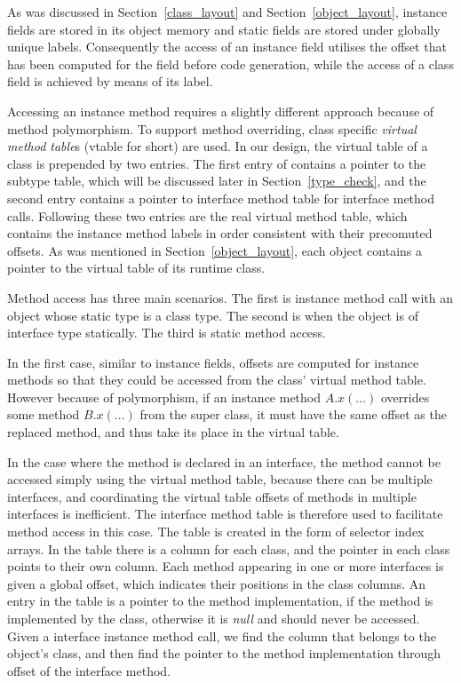 \documentclass[a4paper, notitlepage]{report}
\begin{document}
As was discussed in Section~\ref{class_layout} and Section~\ref{object_layout}, instance fields are stored in its object memory and static fields are stored under globally unique labels. Consequently the access of an instance field utilises the offset that has been computed for the field before code generation, while the access of a class field is achieved by means of its label.

Accessing an instance method requires a slightly different approach because of method polymorphism. To support method overriding, class specific \emph{virtual method table}s (vtable for short) are used. In our design, the virtual table of a class is prepended by two entries. The first entry of contains a pointer to the subtype table, which will be discussed later in Section~\ref{type_check}, and the second entry contains a pointer to interface method table for interface method calls. Following these two entries are the real virtual method table, which contains the instance method labels in order consistent with their precomuted offsets. As was mentioned in Section~\ref{object_layout}, each object contains a pointer to the virtual table of its runtime class. 

Method access has three main scenarios. The first is instance method call with an object whose static type is a class type. The second is when the object is of interface type statically. The third is static method access.

In the first case, similar to instance fields, offsets are computed for instance methods so that they could be accessed from the class' virtual method table. However because of polymorphism, if an instance method $A.x(...)$ overrides some method $B.x(...)$ from the super class, it must have the same offset as the replaced method, and thus take its place in the virtual table. 

In the case where the method is declared in an interface, the method cannot be accessed simply using the virtual method table, because there can be multiple interfaces, and coordinating the virtual table offsets of methods in multiple interfaces is inefficient. The interface method table is therefore used to facilitate method access in this case. The table is created in the form of selector index arrays. In the table there is a column for each class, and the pointer in each class points to their own column. Each method appearing in one or more interfaces is given a global offset, which indicates their positions in the class columns. An entry in the table is a pointer to the method implementation, if the method is implemented by the class, otherwise it is \emph{null} and should never be accessed. Given a interface instance method call, we find the column that belongs to the object's class, and then find the pointer to the method implementation through offset of the interface method.
\end{document}
